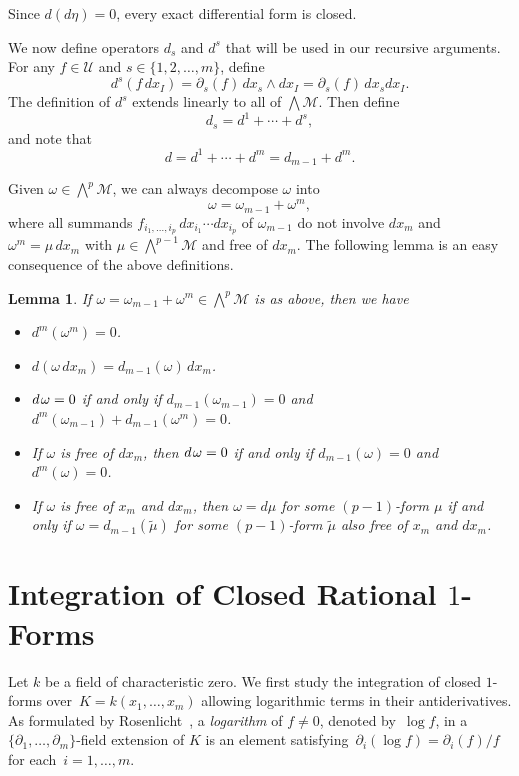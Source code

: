 \documentclass{amsart}
\newtheorem{lem}[thm]{Lemma}
\theoremstyle{definition}
\numberwithin{equation}{section}
\numberwithin{thm}{section}
\begin{document}
Since $d(d\eta) = 0$, every exact differential form is closed.

We now define operators $d_s$ and $d^s$ that will be used in our recursive arguments.  For any $f\in \mathcal{U}$ and $s\in \{1, 2, \ldots, m\}$, define
\[
d^s(f \, dx_I) = \partial_s(f)\,dx_s\wedge dx_I = \partial_s(f)\,dx_s dx_I.
\]
The definition of $d^s$ extends linearly to all of $\bigwedge \mathcal{M}$.  Then define
\[
d_s = d^1 + \cdots + d^s,
\]
and note that
\[
d = d^1 +\cdots + d^m = d_{m-1} + d^m.
\]

Given $\omega \in \bigwedge^p \mathcal{M}$, we can always decompose $\omega$ into
\[
\omega = \omega_{m-1} + \omega^m,
\]
where all summands $f_{i_1, \ldots, i_p} \, dx_{i_1}\cdots dx_{i_p}$ of $\omega_{m-1}$ do not involve $dx_m$ and $\omega^m = \mu\, dx_m$ with $\mu \in \bigwedge^{p-1} \mathcal{M}$ and free of $dx_m$. The following lemma is an easy consequence of the above definitions.
\begin{lem}
\label{LEM:form}
If $\omega = \omega_{m-1} + \omega^m  \in \bigwedge^p \mathcal{M}$ is as above, then we have
\begin{itemize}
\item[{\rm(i)}] $d^m (\omega^m) = 0$.
\item[{\rm(ii)}] $d(\omega \,dx_m) = d_{m-1}(\omega)\, dx_m$.
\item[{\rm(iii)}] $d\hskip1pt\omega =0$ if and only if  $d_{m-1}(\omega_{m-1}) = 0$ and $d^m(\omega_{m-1})  + d_{m-1}(\omega^m)=0$.
\item[{\rm(iv)}] If $\omega$ is free of $dx_m$, then $d\hskip1pt\omega = 0$ if and only if  $d_{m-1}(\omega) = 0$ and $d^m (\omega) = 0$.
\item[{\rm(v)}] If $\omega $ is free of $x_m$ and $dx_m$, then $\omega = d\mu$ for some $(p-1)$-form $\mu$ if and only if $ \omega = d_{m-1}(\tilde \mu)$ for some $(p-1)$-form $\tilde \mu$ also free of $x_m$ and $dx_m$.
\end{itemize}
\end{lem}

\section{Integration of Closed Rational $1$-Forms}
\label{SECT:1form}

Let $k$ be a field of characteristic zero. 
We first study the integration of closed $1$-forms over~$K=k(x_1,\ldots,x_m)$ allowing logarithmic terms in their antiderivatives.
As formulated by Rosenlicht~\cite{Rosenlicht1975},
a \textit{logarithm} of $f \neq 0$, denoted by~$\log f$, in a $\{ \partial_1,\ldots, \partial_m\}$-field extension of $K$ is an element satisfying~$\partial_i(\log f) = \partial_i(f)/f$ for each~$i = 1,\ldots,m$.
\end{document}
